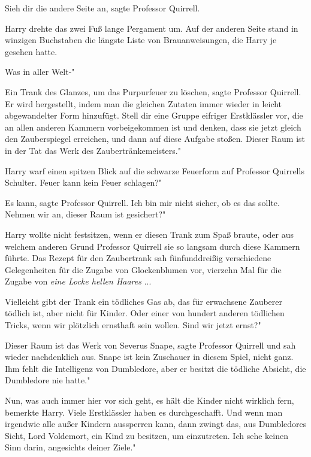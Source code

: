 \glqq{}Sieh dir die andere Seite an\grqq{}, sagte Professor Quirrell.

Harry drehte das zwei Fuß lange Pergament um. Auf der anderen Seite stand in
winzigen Buchstaben die längste Liste von Brauanweisungen, die Harry je gesehen
hatte.

\glqq{}Was in aller Welt-"

\glqq{}Ein Trank des Glanzes, um das Purpurfeuer zu löschen\grqq{}, sagte
Professor Quirrell. \glqq{}Er wird hergestellt, indem man die gleichen Zutaten
immer wieder in leicht abgewandelter Form hinzufügt. Stell dir eine Gruppe
eifriger Erstklässler vor, die an allen anderen Kammern vorbeigekommen ist und
denken, dass sie jetzt gleich den Zauberspiegel erreichen, und dann auf diese
Aufgabe stoßen. Dieser Raum ist in der Tat das Werk des Zaubertränkemeisters."

Harry warf einen spitzen Blick auf die schwarze Feuerform auf Professor
Quirrells Schulter. \glqq{}Feuer kann kein Feuer schlagen?"

\glqq{}Es kann\grqq{}, sagte Professor Quirrell. \glqq{}Ich bin mir nicht sicher,
ob es das sollte. Nehmen wir an, dieser Raum ist gesichert?"

Harry wollte nicht festsitzen, wenn er diesen Trank zum Spaß braute, oder aus
welchem anderen Grund Professor Quirrell sie so langsam durch diese Kammern
führte. Das Rezept für den Zaubertrank sah fünfunddreißig verschiedene
Gelegenheiten für die Zugabe von Glockenblumen vor, vierzehn Mal für die Zugabe
von \emph{\glqq{}eine Locke hellen Haares\grqq{}} ...

\glqq{}Vielleicht gibt der Trank ein tödliches Gas ab, das für erwachsene
Zauberer tödlich ist, aber nicht für Kinder. Oder einer von hundert anderen
tödlichen Tricks, wenn wir plötzlich ernsthaft sein wollen. Sind wir jetzt
ernst?"

\glqq{}Dieser Raum ist das Werk von Severus Snape\grqq{}, sagte Professor
Quirrell und sah wieder nachdenklich aus. \glqq{}Snape ist kein Zuschauer in
diesem Spiel, nicht ganz. Ihm fehlt die Intelligenz von Dumbledore, aber er
besitzt die tödliche Absicht, die Dumbledore nie hatte."

\glqq{}Nun, was auch immer hier vor sich geht, es hält die Kinder nicht wirklich
fern\grqq{}, bemerkte Harry. \glqq{}Viele Erstklässler haben es durchgeschafft.
Und wenn man irgendwie alle außer Kindern aussperren kann, dann zwingt das, aus
Dumbledores Sicht, Lord Voldemort, ein Kind zu besitzen, um einzutreten. Ich
sehe keinen Sinn darin, angesichts deiner Ziele."

